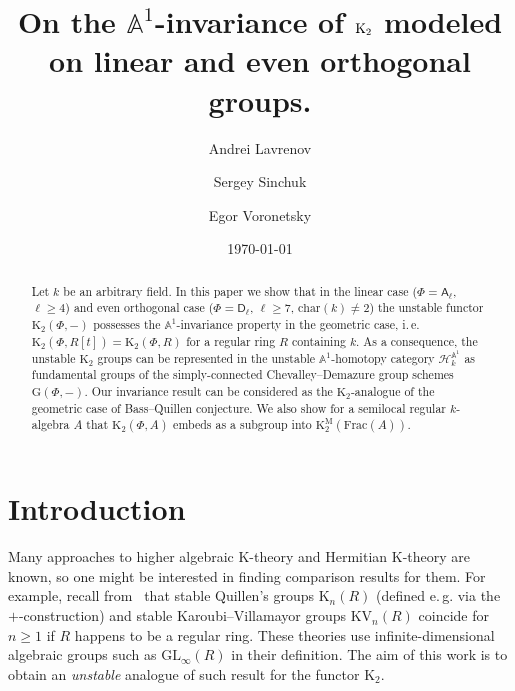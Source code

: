\documentclass[oneside, 11pt]{amsart} \pdfoutput=1
\title{On the $\mathbb{A}^1$-invariance of $\K_2$ modeled on linear and even orthogonal groups.}
\author[1] {Andrei Lavrenov} \email{avlavrenov at gmail.com}
\author[2] {Sergey Sinchuk} \email{sinchukss at gmail.com}
\author[3] {Egor Voronetsky} \email{voronetckiiegor at yandex.ru}
\date {\today}
\newcommand{\K}{{\mathrm{K}}}
\numberwithin{equation}{section}
\theoremstyle{definition}
\newcommand{\rA}{\mathsf{A}}
\newcommand{\rD}{\mathsf{D}}
\begin{document}
\begin{abstract}
 Let $k$ be an arbitrary field. In this paper we show that in the linear case ($\Phi=\rA_\ell$, $\ell \geq 4$) and even orthogonal case ($\Phi = \rD_\ell$, $\ell\geq 7$, $\mathrm{char}(k)\neq 2$) the unstable functor $\mathrm{K}_2(\Phi, -)$ possesses the $\mathbb{A}^1$-invariance property in the geometric case, i.\,e. $\K_2(\Phi, R[t]) = \K_2(\Phi, R)$ for a regular ring $R$ containing $k$. As a consequence, the unstable $\K_2$ groups can be represented in the unstable $\mathbb{A}^1$-homotopy category $\mathcal{H}^{\mathbb{A}^1}_{k}$ as fundamental groups of the simply-connected Chevalley--Demazure group schemes $\mathrm{G}(\Phi,-)$. Our invariance result can be considered as the $\K_2$-analogue of the geometric case of Bass--Quillen conjecture. We also show for a semilocal regular $k$-algebra $A$ that $\K_2(\Phi, A)$ embeds as a subgroup into $\K^\mathrm{M}_2(\mathrm{Frac}(A))$.
\end{abstract}

\maketitle

\section{Introduction}
Many approaches to higher algebraic $\K$-theory and Hermitian $\K$-theory are known, so one might be interested in finding comparison results for them.
For example, recall from~\cite[Theorem~IV.11.8]{Kbook} that stable Quillen's groups $\K_n(R)$ (defined e.\,g. via the $+$-construction) and stable Karoubi--Villamayor groups $\mathrm{KV}_n(R)$ coincide for $n\geq 1$ if $R$ happens to be a regular ring.
These theories use infinite-dimensional algebraic groups such as $\mathrm{GL}_\infty(R)$ in their definition. 
The aim of this work is to obtain an {\it unstable} analogue of such result for the functor $\K_2$.
\end{document}
